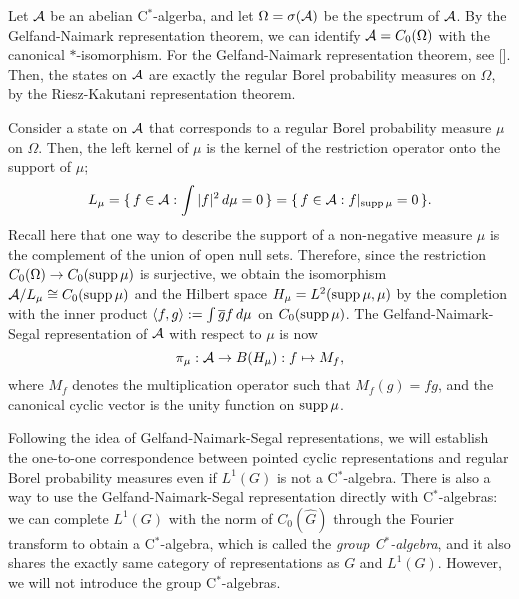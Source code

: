 \documentclass[a4paper]{article}
\begin{document}
\begin{ex}
Let $\mathcal{A}$ be an abelian C$^*$-algerba, and let $\Omega=\sigma(\mathcal{A})$ be the spectrum of $\mathcal{A}$.
By the Gelfand-Naimark representation theorem, we can identify $\mathcal{A}=C_0(\Omega)$ with the canonical $*$-isomorphism.
For the Gelfand-Naimark representation theorem, see [].
Then, the states on $\mathcal{A}$ are exactly the regular Borel probability measures on $\Omega$, by the Riesz-Kakutani representation theorem.

Consider a state on $\mathcal{A}$ that corresponds to a regular Borel probability measure $\mu$ on $\Omega$.
Then, the left kernel of $\mu$ is the kernel of the restriction operator onto the support of $\mu$;
\[L_\mu=\{\,f\in\mathcal{A}:\int|f|^2\,d\mu=0\,\}=\{\,f\in\mathcal{A}:f|_{\operatorname{supp}\mu}=0\,\}.\]
Recall here that one way to describe the support of a non-negative measure $\mu$ is the complement of the union of open null sets.
Therefore, since the restriction $C_0(\Omega)\to C_0(\operatorname{supp}\mu)$ is surjective, we obtain the isomorphism $\mathcal{A}/L_\mu\cong C_0(\operatorname{supp}\mu)$ and the Hilbert space $H_\mu=L^2(\operatorname{supp}\mu,\mu)$ by the completion with the inner product $\langle f,g\rangle:=\int\overline gf\,d\mu$ on $C_0(\operatorname{supp}\mu)$.
The Gelfand-Naimark-Segal representation of $\mathcal{A}$ with respect to $\mu$ is now
\[\pi_\mu:\mathcal{A}\to B(H_\mu):f\mapsto M_f,\]
where $M_f$ denotes the multiplication operator such that $M_f(g)=fg$, and the canonical cyclic vector is the unity function on $\operatorname{supp}\mu$.
\end{ex}

Following the idea of Gelfand-Naimark-Segal representations, we will establish the one-to-one correspondence between pointed cyclic representations and regular Borel probability measures even if $L^1(G)$ is not a C$^*$-algebra.
There is also a way to use the Gelfand-Naimark-Segal representation directly with C$^*$-algebras: we can complete $L^1(G)$ with the norm of $C_0(\hat G)$ through the Fourier transform to obtain a C$^*$-algebra, which is called the \emph{group C$^*$-algebra}, and it also shares the exactly same category of representations as $G$ and $L^1(G)$.
However, we will not introduce the group C$^*$-algebras.
\end{document}
